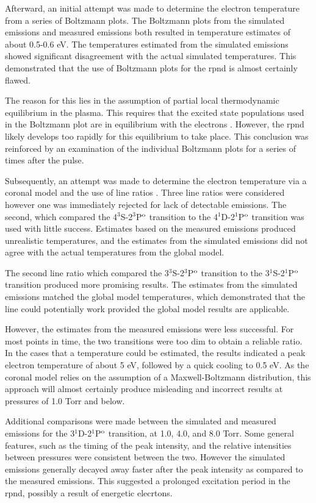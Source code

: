 Afterward, an initial attempt was made to determine the electron temperature
from a series of Boltzmann plots. The Boltzmann plots from the simulated
emissions and measured emissions both resulted in temperature estimates of about
0.5-0.6 eV. The temperatures estimated from the simulated emissions showed
significant disagreement with the actual simulated temperatures. This
demonstrated that the use of Boltzmann plots for the \acs{rpnd} is almost
certainly flawed.

The reason for this lies in the assumption of partial local thermodynamic
equilibrium in the plasma. This requires that the excited state populations used
in the Boltzmann plot are in equilibrium with the electrons \cite{Kunze2009}.
However, the \acs{rpnd} likely develops too rapidly for this equilibrium to take
place. This conclusion was reinforced by an examination of the individual
Boltzmann plots for a series of times after the pulse.

Subsequently, an attempt was made to determine the electron temperature via a
coronal model and the use of line ratios \cite{Griem2005}. Three line ratios
were considered however one was immediately rejected for lack of detectable
emissions. The second, which compared the 4$^3$S-2$^3$P$^\mathrm{o}$ transition to the
4$^1$D-2$^1$P$^\mathrm{o}$ transition was used with little success. Estimates based on
the measured emissions produced unrealistic temperatures, and the estimates from
the simulated emissions did not agree with the actual temperatures from the
global model.

The second line ratio which compared the 3$^3$S-2$^3$P$^\mathrm{o}$ transition to the
3$^1$S-2$^1$P$^\mathrm{o}$ transition produced more promising results. The estimates
from the simulated emissions matched the global model temperatures, which
demonstrated that the line could potentially work provided the global model
results are applicable.

However, the estimates from the measured emissions were less successful. For
most points in time, the two transitions were too dim to obtain a reliable
ratio. In the cases that a temperature could be estimated, the results indicated
a peak electron temperature of about 5 eV, followed by a quick cooling to 0.5
eV. As the coronal model relies on the assumption of a Maxwell-Boltzmann
distribution, this approach will almost certainly produce misleading and
incorrect results at pressures of 1.0 Torr and below.

Additional comparisons were made between the simulated and measured emissions
for the 3$^1$D-2$^1$P$^\mathrm{o}$ transition, at 1.0, 4.0, and 8.0 Torr. Some general
features, such as the timing of the peak intensity, and the relative intensities
between pressures were consistent between the two. However the simulated
emissions generally decayed away faster after the peak intensity as compared to
the measured emissions. This suggested a prolonged excitation period in the
\acs{rpnd}, possibly a result of energetic elecrtons.

